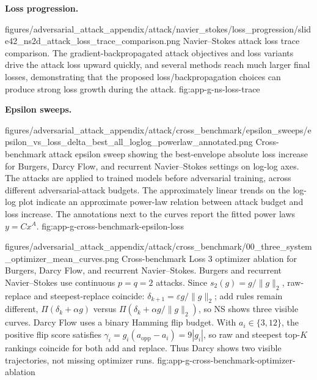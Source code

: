 \noindent\textbf{Loss progression.}

\appendixattackfig
  {figures/adversarial_attack_appendix/attack/navier_stokes/loss_progression/slide42_ns2d_attack_loss_trace_comparison.png}
  {Navier--Stokes attack loss trace comparison. The gradient-backpropagated
  attack objectives and loss variants drive the attack loss upward quickly, and
  several methods reach much larger final losses, demonstrating that the
  proposed loss/backpropagation choices can produce strong loss growth during
  the attack.}
  {fig:app-g-ns-loss-trace}

\FloatBarrier
{}

\noindent\textbf{Epsilon sweeps.}

\appendixattackfig
  {figures/adversarial_attack_appendix/attack/cross_benchmark/epsilon_sweeps/epsilon_vs_loss_delta_best_all_loglog_powerlaw_annotated.png}
  {Cross-benchmark attack epsilon sweep showing the best-envelope absolute
  loss increase for Burgers, Darcy Flow, and recurrent Navier--Stokes settings
  on log-log axes. The attacks are applied to trained models before
  adversarial training, across different adversarial-attack budgets. The
  approximately linear trends on the log-log plot indicate an approximate
  power-law relation between attack budget and loss increase. The annotations
  next to the curves report the fitted power laws \(y=Cx^A\).}
  {fig:app-g-cross-benchmark-epsilon-loss}

\appendixattackfig
  {figures/adversarial_attack_appendix/attack/cross_benchmark/00_three_system_optimizer_mean_curves.png}
  {Cross-benchmark Loss 3 optimizer ablation for Burgers, Darcy Flow, and
  recurrent Navier--Stokes. Burgers and recurrent Navier--Stokes use continuous
  \(p=q=2\) attacks. Since \(s_2(g)=g/\|g\|_2\),
  raw-replace and steepest-replace coincide:
  \(\delta_{k+1}=\varepsilon g/\|g\|_2\); add rules remain different,
  \(\Pi(\delta_k+\alpha g)\) versus
  \(\Pi(\delta_k+\alpha g/\|g\|_2)\), so NS shows three visible curves. Darcy
  Flow uses a binary Hamming flip budget. With \(a_i\in\{3,12\}\),
  the positive flip score satisfies
  \(\gamma_i=g_i(a_{\mathrm{opp}}-a_i)=9|g_i|\), so raw and steepest top-\(K\)
  rankings coincide for both add and replace. Thus Darcy shows two visible
  trajectories, not missing optimizer runs.}
  {fig:app-g-cross-benchmark-optimizer-ablation}

\FloatBarrier
{}

